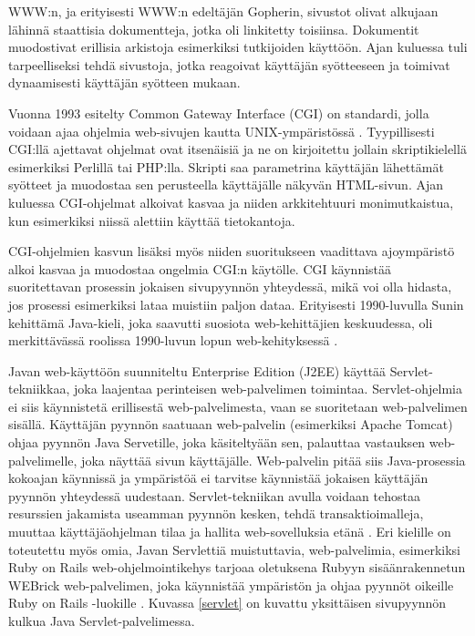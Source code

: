 WWW:n, ja erityisesti WWW:n edeltäjän Gopherin, sivustot olivat alkujaan lähinnä staattisia dokumentteja, jotka oli linkitetty toisiinsa. Dokumentit muodostivat erillisia arkistoja esimerkiksi tutkijoiden käyttöön. Ajan kuluessa tuli tarpeelliseksi tehdä sivustoja, jotka reagoivat käyttäjän syötteeseen ja toimivat dynaamisesti käyttäjän syötteen mukaan.

Vuonna 1993 esitelty Common Gateway Interface (CGI) on standardi, jolla voidaan ajaa ohjelmia web-sivujen kautta UNIX-ympäristössä \cite{rfc3875}. Tyypillisesti CGI:llä ajettavat ohjelmat ovat itsenäisiä ja ne on kirjoitettu jollain skriptikielellä esimerkiksi Perlillä tai PHP:lla. Skripti saa parametrina käyttäjän lähettämät syötteet ja muodostaa sen perusteella käyttäjälle näkyvän HTML-sivun. Ajan kuluessa CGI-ohjelmat alkoivat kasvaa ja niiden arkkitehtuuri monimutkaistua, kun esimerkiksi niissä alettiin käyttää tietokantoja.

CGI-ohjelmien kasvun lisäksi myös niiden suoritukseen vaadittava ajoympäristö alkoi kasvaa ja muodostaa ongelmia CGI:n käytölle. CGI käynnistää suoritettavan prosessin jokaisen sivupyynnön yhteydessä, mikä voi olla hidasta, jos prosessi esimerkiksi lataa muistiin paljon dataa. Erityisesti 1990-luvulla Sunin kehittämä Java-kieli, joka saavutti suosiota web-kehittäjien keskuudessa, oli merkittävässä roolissa 1990-luvun lopun web-kehityksessä \cite{uml}.

Javan web-käyttöön suunniteltu Enterprise Edition (J2EE) käyttää Servlet-tekniikkaa, joka laajentaa perinteisen web-palvelimen toimintaa. Servlet-ohjelmia ei siis käynnistetä erillisestä web-palvelimesta, vaan se suoritetaan web-palvelimen sisällä. Käyttäjän pyynnön saatuaan web-palvelin (esimerkiksi Apache Tomcat) ohjaa pyynnön Java Servetille, joka käsiteltyään sen, palauttaa vastauksen web-palvelimelle, joka näyttää sivun käyttäjälle. Web-palvelin pitää siis Java-prosessia kokoajan käynnissä ja ympäristöä ei tarvitse käynnistää jokaisen käyttäjän pyynnön yhteydessä uudestaan. Servlet-tekniikan avulla voidaan tehostaa resurssien jakamista useamman pyynnön kesken, tehdä transaktioimalleja, muuttaa käyttäjäohjelman tilaa ja hallita web-sovelluksia etänä \cite{uml}. Eri kielille on toteutettu myös omia, Javan Servlettiä muistuttavia, web-palvelimia, esimerkiksi Ruby on Rails web-ohjelmointikehys tarjoaa oletuksena Rubyyn sisäänrakennetun WEBrick web-palvelimen, joka käynnistää ympäristön ja ohjaa pyynnöt oikeille Ruby on Rails -luokille \cite{ruby2011agile}. Kuvassa \ref{servlet} on kuvattu yksittäisen sivupyynnön kulkua Java Servlet-palvelimessa.


